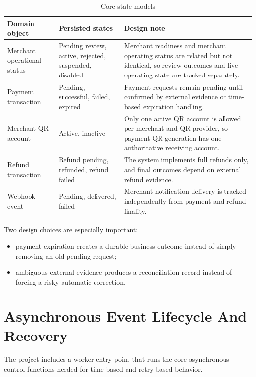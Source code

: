 \begin{table}[!htbp]
\centering
\caption{Core state models}
\begin{tabularx}{\textwidth}{L{0.24\textwidth}L{0.24\textwidth}Y}
\toprule
\textbf{Domain object} & \textbf{Persisted states} & \textbf{Design note} \\
\midrule
Merchant operational status & Pending review, active, rejected, suspended, disabled & Merchant readiness and merchant operating status are related but not identical, so review outcomes and live operating state are tracked separately. \\
\bodyrowrule
Payment transaction & Pending, successful, failed, expired & Payment requests remain pending until confirmed by external evidence or time-based expiration handling. \\
\bodyrowrule
Merchant QR account & Active, inactive & Only one active QR account is allowed per merchant and QR provider, so payment QR generation has one authoritative receiving account. \\
\bodyrowrule
Refund transaction & Refund pending, refunded, refund failed & The system implements full refunds only, and final outcomes depend on external refund evidence. \\
\bodyrowrule
Webhook event & Pending, delivered, failed & Merchant notification delivery is tracked independently from payment and refund finality. \\
\bottomrule
\end{tabularx}
\end{table}

Two design choices are especially important:

\begin{itemize}
  \item payment expiration creates a durable business outcome instead of simply
  removing an old pending request;
  \item ambiguous external evidence produces a reconciliation record instead of
  forcing a risky automatic correction.
\end{itemize}

\section{Asynchronous Event Lifecycle And Recovery}

The project includes a worker entry point that runs the core asynchronous
control functions needed for time-based and retry-based behavior.

